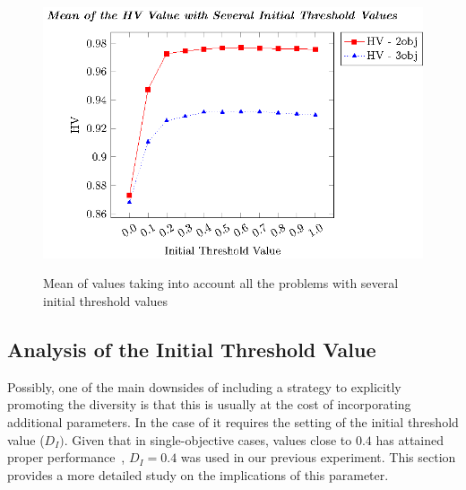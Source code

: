 \begin{figure}[t]
\centering
\includegraphics[scale=0.75]{images/Graphic-Initial-Distance_tikz-figure0.eps} \\
\caption{Mean of \HV{} values taking into account all the problems with several initial threshold values}\label{fig:Initial-distance-factor}
\end{figure}


\subsection{Analysis of the Initial Threshold Value}

Possibly, one of the main downsides of including a strategy to explicitly promoting the diversity 
is that this is usually at the cost of incorporating additional parameters.
%
In the case of \AVSDMOEAD{} it requires the setting of the initial threshold value ($D_I)$.
%
Given that in single-objective cases, values close to $0.4$ has attained proper performance~\cite{romero2018memetic,castillo2019differential},
$D_I = 0.4$ was used in our previous experiment.
%
This section provides a more detailed study on the implications of this parameter.
%

